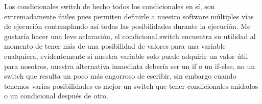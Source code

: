 \documentclass[a4paper,12pt]{article}
\begin{document}
\noindent \hspace*{0.49in}\hspace*{0.49in}\par


\noindent \hspace*{0.49in}\hspace*{0.49in}{\fontsize{10pt}{10pt}\selectfont $ \} $}\par


\noindent \hspace*{0.49in}\par


\noindent \hspace*{0.49in}\par


\noindent \hspace*{0.49in}{\fontsize{10pt}{10pt}\selectfont $ \} $}\par


\noindent {}\par


\noindent {}\par


\noindent {\fontsize{10pt}{10pt}\selectfont $ \} $}\par


\noindent \begin{justify}
Los condicionales switch de hecho todos los condicionales en sí, son extremadamente útiles pues permiten definirle a nuestro software múltiples vías de ejecución contemplando así todas las posibilidades durante la ejecución. Me gustaría hacer una leve aclaración, el condicional switch encuentra su utilidad al momento de tener más de una posibilidad de valores para una variable cualquiera, evidentemente si nuestra variable solo puede adquirir un valor útil para nosotros, nuestra alternativa inmediata debería ser un if o un if-else, no un switch que resulta un poco más engorroso de escribir, sin embargo cuando tenemos varias posibilidades es mejor un switch que tener condicionales anidados o un condicional después de otro.
\end{justify}\par
\end{document}
